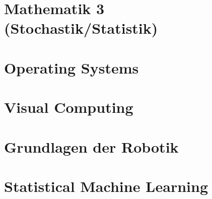 \part{Mathematik 3 (Stochastik/Statistik)}
\graphicspath{{./mandatory/fs4/mathe3-stochastik/}}
\renewcommand{\lstbasepath}{./mandatory/fs4/mathe3-stochastik}

\part{Operating Systems}
\graphicspath{{./mandatory/fs5/os/}}
\renewcommand{\lstbasepath}{./mandatory/fs5/os}

\part{Visual Computing}
\graphicspath{{./mandatory/fs5/vc/}}
\renewcommand{\lstbasepath}{./mandatory/fs5/vc}

\part{Grundlagen der Robotik}
\graphicspath{{./elective/ce/gdr/}}
\renewcommand{\lstbasepath}{./elective/ce/gdr}

\part{Statistical Machine Learning}
\graphicspath{{./elective/vc/statml/}}
\renewcommand{\lstbasepath}{./elective/vc/statml}

